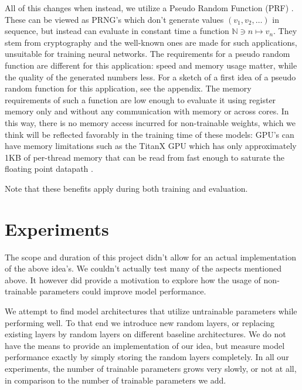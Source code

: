 \documentclass[]{article}
\begin{document}
\begin{multicols}{2}
	All of this changes when instead, we utilize a Pseudo Random Function (PRF) \cite{Goldreich_Goldwasser_Micali_1986}. These can be viewed as PRNG's which don't generate values $(v_1, v_2, \ldots)$ in sequence, but instead can evaluate in constant time a function $\mathds{N} \ni n \mapsto v_n$. They stem from cryptography and the well-known ones are made for such applications, unsuitable for training neural networks. The requirements for a pseudo random function are different for this application: speed and memory usage matter, while the quality of the generated numbers less. For a sketch of a first idea of a pseudo random function for this application, see the appendix. The memory requirements of such a function are low enough to evaluate it using register memory only and without any communication with memory or across cores. In this way, there is no memory access incurred for non-trainable weights, which we think will be reflected favorably in the training time of these models: GPU's can have memory limitations such as the TitanX GPU which has only approximately 1KB of per-thread memory that can be read from fast enough to saturate the floating point datapath \cite{DBLP:conf/icml/DiamosSCCCEEHS16}. 
	
	Note that these benefits apply during both training and evaluation.
	
	\section{Experiments}
	The scope and duration of this project didn't allow for an actual implementation of the above idea's. We couldn't actually test many of the aspects mentioned above. It however did provide a motivation to explore how the usage of non-trainable parameters could improve model performance.
	
	We attempt to find model architectures that utilize untrainable parameters while performing well. To that end we introduce new random layers, or replacing existing layers by random layers on different baseline architectures. We do not have the means to provide an implementation of our idea, but measure model performance exactly by simply storing the random layers completely. In all our experiments, the number of trainable parameters grows very slowly, or not at all, in comparison to the number of trainable parameters we add.
	

\end{multicols}
\end{document}
